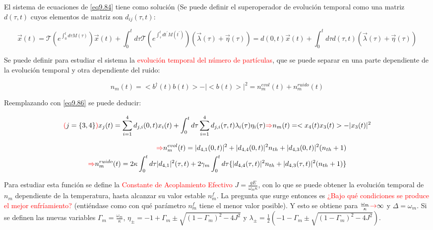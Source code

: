 \documentclass{book}
\begin{document}
El sistema de ecuaciones de \ref{eq9.84} tiene como solución (Se puede definir el superoperador de evolución temporal como una matriz $d(\tau,t)$ cuyos elementos de matriz son $d_{ij}(\tau,t)$:

\begin{equation}\label{eq9.86}\vec{x}(t)=\mathcal{T}(e^{\int_0^t d\tau M(\tau)})\vec{x}(t)
+\int_0^t d\tau \mathcal{T}(e^{\int_\tau^t dt^\prime M(t^\prime) })(\vec{\lambda}(\tau)+
\vec{\eta}(\tau))=d(0,t)\vec{x}(t)+\int_0^t d\tau d(\tau,t)(\vec{\lambda}(\tau)+\vec{\eta}(\tau))\end{equation}

Se puede definir para estudiar el sistema la \textcolor{red}{evolución temporal del número de partículas}, que se puede separar en una parte dependiente de la evolución temporal y otra dependiente del ruido:

\begin{equation}\label{eq9.87}n_m(t)=<b^\dag(t) b(t)>-\lvert<b(t)>\rvert^2=n_m^{evol}(t)+n_m^{ruido}(t)\end{equation}

Reemplazando con \ref{eq9.86} se puede deducir:

\begin{equation}\label{eq9.88}\textcolor{red}{(}j=\{3,4\}\textcolor{red}{)}x_j(t)=\sum_{i=1}^4 d_{j,i}(0,t)x_i(t)+\int_0^t d\tau \sum_{i=1}^4 d_{j,i}(\tau,t)\lambda_i(\tau)\eta_i(\tau)\textcolor{red}{\Rightarrow} n_m(t)=<x_4(t)x_3(t)>-\lvert x_3(t)\rvert^2\end{equation}

\begin{equation}\label{eq9.89}\begin{aligned}\textcolor{red}{\Rightarrow} n_m^{evol}(t)=\lvert d_{4,1}(0,t)\rvert^2+\lvert d_{4,4}(0,t)\rvert^2 n_{th}+\lvert d_{4,3}(0,t)\rvert^2 (n_{th}+1) \\ \textcolor{red}{\Rightarrow} n_m^{ruido}(t)=2\kappa\int_0^t d\tau \lvert d_{4,1}\rvert^2(\tau,t)+2\gamma_m\int_0^t d\tau \{\lvert d_{4,4}(\tau,t)\rvert^2 n_{th}+\lvert d_{4,3}(\tau,t)\rvert^2 (n_{th}+1) \}\end{aligned}
\end{equation}

Para estudiar esta función se define la \textcolor{red}{Constante de Acoplamiento Efectivo} $J=\frac{gE}{\omega_m \kappa}$, con lo que se puede obtener la evolución temporal de $n_m$ dependiente de la temperatura, hasta alcanzar su valor estable $n_m^f$. La pregunta que surge entonces es \textcolor{red}{¿Bajo qué condiciones se produce el mejor enfríamiento?} (entiéndase como con qué parámetro $n_m^f$ tiene el menor valor posible). Y esto se obtiene para $\frac{\omega_m}{\kappa}\textcolor{red}{\rightarrow}\infty$ y $\Delta=\omega_m$. Si se definen las nuevas variables $\Gamma_m=\frac{\omega_m}{\kappa}$, $\eta_\pm=-1+\Gamma_m\pm\sqrt{(1-\Gamma_m)^2-4J^2}$ y $\lambda_\pm=\frac{1}{2}(-1-\Gamma_m\pm\sqrt{(1-\Gamma_m)^2-4J^2})$.
\end{document}
